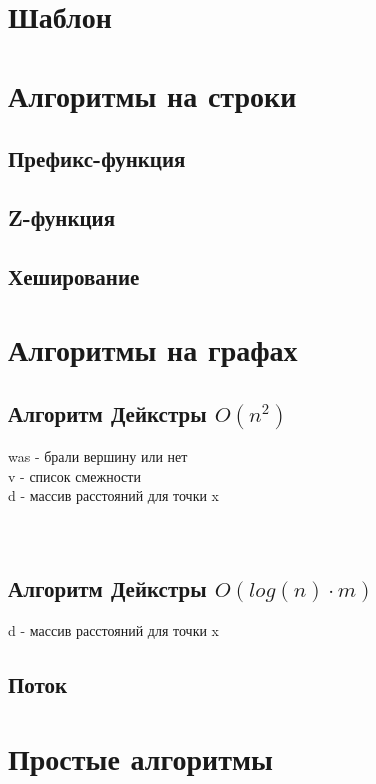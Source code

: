 \documentclass[a4paper]{article}
\begin{document}
	\begin{multicols*}{2}
		\section{Шаблон}
		
		\section{Алгоритмы на строки}
		\subsection{Префикс-функция}
		
		\subsection{Z-функция}
		
		\subsection{Хеширование}
		
		\section{Алгоритмы на графах}
		\subsection{Алгоритм Дейкстры $O(n^2)$}
		was - брали вершину или нет \\
		v - список смежности \\
		d - массив расстояний для точки x
		\\
		\\
		\\
		
		\subsection{Алгоритм Дейкстры $O(log(n) \cdot m)$}
		d - массив расстояний для точки x
				
		\subsection{Поток}
		
		\section{Простые алгоритмы}

\end{multicols*}
\end{document}
